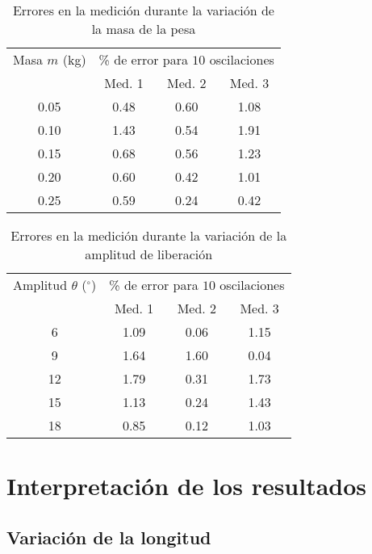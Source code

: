\documentclass[twocolumn]{article}
\numberwithin{table}{section}
\begin{document}
\begin{table}[ht]
  \centering
  \begin{tabular}{cccc}
    \toprule
    Masa $m$ (kg) & \multicolumn{3}{c}{\% de error para $10$
    oscilaciones} \\
    \cmidrule(lr){2-4}
    & Med. 1 & Med. 2 & Med. 3  \\
    \midrule
    0.05 & 0.48 & 0.60 & 1.08 \\
    0.10 & 1.43 & 0.54 & 1.91 \\
    0.15 & 0.68 & 0.56 & 1.23 \\
    0.20 & 0.60 & 0.42 & 1.01 \\
    0.25 & 0.59 & 0.24 & 0.42 \\
    \bottomrule
  \end{tabular}
  \caption{Errores en la medición durante la variación de la
  masa de la pesa}\label{tab:error_masa}
\end{table}

\begin{table}[ht]
  \centering
  \begin{tabular}{cccc}
    \toprule
    Amplitud $\theta$ ($^{\circ}$) & \multicolumn{3}{c}{\% de
      error para $10$
    oscilaciones} \\
    \cmidrule(lr){2-4}
    & Med. 1 & Med. 2 & Med. 3  \\
    \midrule
    6  & 1.09 & 0.06 & 1.15 \\
    9  & 1.64 & 1.60 & 0.04 \\
    12 & 1.79 & 0.31 & 1.73 \\
    15 & 1.13 & 0.24 & 1.43 \\
    18 & 0.85 & 0.12 & 1.03 \\
    \bottomrule
  \end{tabular}
  \caption{Errores en la medición durante la variación de la
  amplitud de liberación}\label{tab:error_amplitud}
\end{table}

\section{Interpretación de los resultados}

\subsection{Variación de la longitud}
\end{document}

